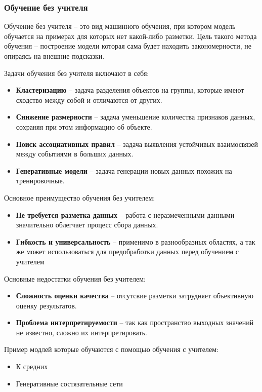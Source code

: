 \documentclass[../part_1.tex]{subfiles}
\begin{document}
\subsubsection{Обучение без учителя} %
    \label{sec:without_teacher}
    \par Обучение без учителя --  это вид машинного обучения, при котором модель обучается на примерах для которых нет какой-либо разметки. Цель такого метода обучения -- построение модели которая сама будет находить закономерности, не опираясь на внешние подсказки. 
    \par Задачи обучения без учителя включают в себя:
    \begin{itemize}
        \item \textbf{Кластеризацию} -- задача разделения объектов на группы, которые имеют сходство между собой и отличаются от других.
        \item \textbf{Снижение размерности} -- задача уменьшение количества признаков данных, сохраняя при этом информацию об объекте.
        \item \textbf{Поиск ассоциативных правил} -- задача выявления устойчивых взаимосвязей между событиями в больших данных.
        \item \textbf{Генеративные модели} -- задача генерации новых данных похожих на тренировочные.
    \end{itemize}
    \par Основное преимущество обучения без учителем:
    \begin{itemize}
        \item \textbf{Не требуется разметка данных} -- работа с неразмеченными данными значительно облегчает процесс сбора данных.
        \item \textbf{Гибкость и универсальность} -- применимо в разнообразных областях, а так же может использоваться для предобработки данных перед обучением с учителем
    \end{itemize}
    \par Основные недостатки обучения без учителем:
    \begin{itemize}
        \item \textbf{Сложность оценки качества} -- отсутсвие разметки затрудняет объективную оценку результатов.
        \item \textbf{Проблема интерпретируемости} -- так как пространство выходных значений не известно, сложно их интерпретировать. 
    \end{itemize}
    \par Пример модлей которые обучаются с помощью обучения с учителем:
    \begin{itemize}
        \item К средних
        \item Генеративные состязательные сети
    \end{itemize}
\end{document}

